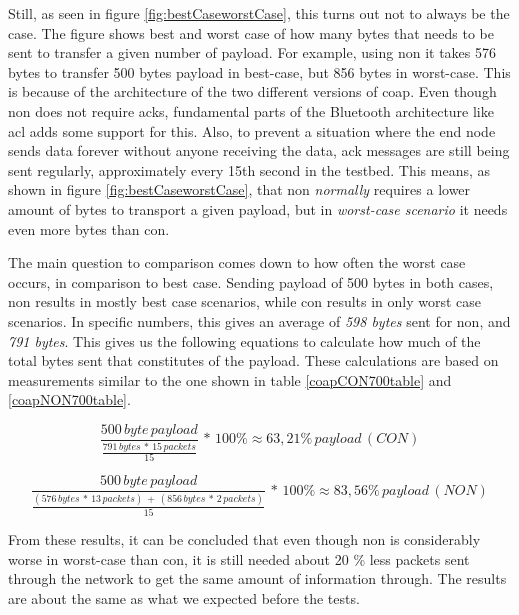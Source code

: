 \noindent Still, as seen in figure \ref{fig:bestCaseworstCase}, this turns out not to always be the case. The figure shows best and worst case of how many bytes that needs to be sent to transfer a given number of \gls{payload}. For example, using \gls{non} it takes 576 bytes to transfer 500 bytes payload in best-case, but 856 bytes in worst-case. This is because of the architecture of the two different versions of \gls{coap}. Even though \gls{non} does not require \glspl{ack}, fundamental parts of the Bluetooth architecture like \gls{acl} adds some support for this. Also, to prevent a situation where the end node sends data forever without anyone receiving the data, \gls{ack} messages are still being sent regularly, approximately every 15th second in the testbed. This means, as shown in figure \ref{fig:bestCaseworstCase}, that \gls{non} \textit{normally} requires a lower amount of bytes to transport a given \gls{payload}, but in \textit{worst-case scenario} it needs even more bytes than \gls{con}. 

\noindent The main question to comparison comes down to how often the worst case occurs, in comparison to best case. Sending \gls{payload} of 500 bytes in both cases, \gls{non} results in mostly best case scenarios, while \gls{con} results in only worst case scenarios. In specific numbers, this gives an average of \textit{598 bytes} sent for \gls{non}, and \textit{791 bytes}. This gives us the following equations to calculate how much of the total bytes sent that constitutes of the \gls{payload}. These calculations are based on measurements similar to the one shown in table \ref{coapCON700table} and \ref{coapNON700table}.


\begin{equation} \label{bestWorstEquation}
	\frac{500 \, byte \, payload}{\frac{791 \, bytes \,*\, 15 \, packets}{15}}\,*\,100 \% \approx 63,21 \%\, payload \, (CON)
\end{equation}

\begin{equation} \label{bestWorstEquation2}
\frac{500\, byte\, payload}{\frac{(576\, bytes\, *\, 13\, packets)\,+\,(856\, bytes\, *\, 2 \,packets)}{15}}\,*\,100 \% \approx 83,56 \%\, payload \, (NON)
\end{equation}

\noindent From these results, it can be concluded that even though \gls{non} is considerably worse in worst-case than \gls{con}, it is still needed about 20 \% less packets sent through the network to get the same amount of information through. The results are about the same as what we expected before the tests. 



